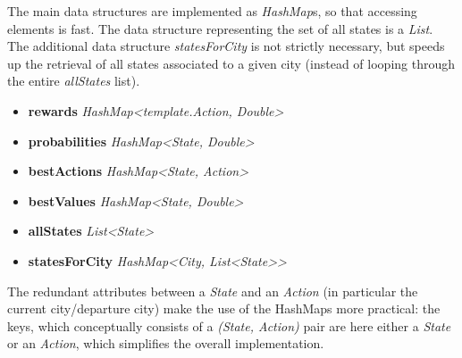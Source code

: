 \documentclass[10pt]{article}
\begin{document}
The main data structures are implemented as \textit{HashMap}s, so that accessing elements is fast. The data structure representing the set of all states is a \textit{List}. The additional data structure \textit{statesForCity} is not strictly necessary, but speeds up the retrieval of all states associated to a given city (instead of looping through the entire \textit{allStates} list).
\begin{itemize}
\itemsep 1mm 
\item[]\textbf{rewards}  \textit{HashMap\textless template.Action, Double\textgreater}
\item[]\textbf{probabilities} \textit{HashMap\textless State, Double\textgreater}
\item[]\textbf{bestActions} \textit{HashMap\textless State, Action\textgreater}
\item[]\textbf{bestValues} \textit{HashMap\textless State, Double\textgreater}
\item[]\textbf{allStates} \textit{List\textless State\textgreater}
\item[]\textbf{statesForCity} \textit{HashMap\textless City, List\textless State\textgreater \textgreater}
\end{itemize}

\noindent
The redundant attributes between a \textit{State} and an \textit{Action} (in particular the current city/departure city) make the use of the HashMaps more practical: the keys, which conceptually consists of a \textit{(State, Action)} pair are here either a \textit{State} or an \textit{Action}, which simplifies the overall implementation.
\end{document}

